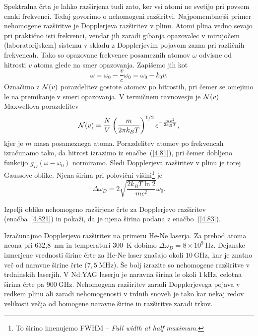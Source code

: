 Spektralna črta je lahko razširjena tudi zato, ker vsi atomi ne svetijo
pri povsem enaki frekvenci. Tedaj govorimo o nehomogeni 
razširitvi.
Najpomembnejši primer nehomogene razširitve je Dopplerjeva 
 razširitev v plinu. 
Atomi plina vedno sevajo pri praktično isti frekvenci, vendar jih zaradi gibanja
opazovalec v mirujočem (laboratorijskem) sistemu v skladu z Dopplerjevim pojavom 
zazna pri različnih frekvencah. Tako so opazovane frekvence posameznih atomov $\omega$
odvisne od hitrosti $v$ atoma glede na smer opazovanja. Zapišemo jih kot  
\begin{equation}
\omega=\omega_{0}-\frac{v}{c}\omega_{0}=\omega_{0}-k_{0}v.
\label{4.81}
\end{equation}
Označimo z ${\cal N}(v)$ porazdelitev gostote atomov po hitrostih, pri čemer se omejimo 
le na premikanje v smeri opazovanja. V termičnem ravnovesju je ${\cal N}(v)$
Maxwellova porazdelitev
\begin{equation}
{\cal N}(v)=\frac{N}{V}\left(\frac{m}{2\pi k_{B}T}\right)^{1/2}e^{-\frac{mv^{2}}{2k_{B}T}},
\label{4.82}
\end{equation}
kjer je $m$ masa posameznega atoma.
Porazdelitev atomov po frekvencah izračunamo tako, da hitrost izrazimo
iz enačbe~(\ref{4.81}), pri čemer dobljeno funkcijo $g_{D}(\omega-\omega_0)$
normiramo. Sledi
Dopplerjeva razširitev v plinu je torej Gaussove oblike.
Njena širina pri polovični 
višini\footnote{To širino imenujemo FWHM -- \it{Full width at half maximum}.} je
\begin{equation} 
\Delta\omega_{D}=2 \sqrt{\frac{2k_{B}T \ln 2}{mc^{2}}}\omega_{0}.
\label{4.83}
\end{equation}
\begin{definition}
Izpelji obliko nehomogeno razširjene črte za Dopplerjevo razširitev (enačba~\ref{4.821})
in pokaži, da je njena širina podana z enačbo~(\ref{4.83}).
\end{definition}

Izračunajmo Dopplerjevo razširitev na primeru He-Ne laserja. Za prehod
atoma neona pri 632,8~nm in temperaturi 300~K dobimo 
$\Delta\omega_{D}=8\times10^{9}~\si{\hertz}$. Dejanske izmerjene vrednosti širine 
črte za He-Ne laser 
znašajo okoli $10~\si{\giga\hertz}$, kar je znatno več od naravne širine
črte ($7,5~\si{\mega\hertz}$). Še bolj izrazite so nehomogene razširitve v trdninskih laserjih.
V Nd:YAG laserju je naravna širina le okoli $1~\si{\kilo\hertz}$, celotna širina črte
pa $900~\si{\giga\hertz}$. Nehomogena razširitev zaradi Dopplerjevega pojava v 
redkem plinu ali zaradi nehomogenosti v trdnih snoveh je tako kar nekaj redov velikosti 
večja od homogene naravne širine in razširitve zaradi trkov.

